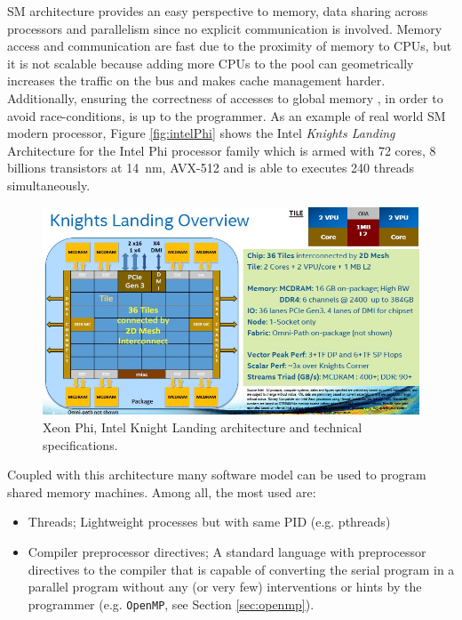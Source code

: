 \begin{description}
\begin{description}
\begin{itemize}
	\end{itemize}
	SM architecture provides an easy perspective to memory,	data sharing across processors and parallelism since no explicit communication is involved. Memory access and communication are fast due to the proximity of memory to CPUs, but it is not scalable because adding more CPUs to the pool can geometrically increases the traffic on the bus and makes cache management harder. Additionally, ensuring the correctness of accesses to global memory , in order to avoid race-conditions, is up to the programmer.
	As an example of real world SM modern processor, Figure \ref{fig:intelPhi} shows the Intel \textit{Knights Landing} Architecture for the Intel Phi processor family which is armed with 72 cores, $8$ billions transistors at \SI{14}{\nano\metre}, AVX-512 and is able to executes 240 threads simultaneously.
		\begin{figure}
		\centering
		\label{fig:distribuiteMemory}
		\includegraphics[width=1.0\textwidth]{./images/parallel_programming/xeonphi}
		\caption{Xeon Phi, Intel Knight Landing architecture and technical specifications.}
	\end{figure}

	Coupled with this architecture many software model can be used to program
	shared memory machines. Among all, the most used are:
	\begin{itemize}
		\item Threads; Lightweight processes but with same PID (e.g. pthreads)
		\item Compiler preprocessor directives; A standard language with preprocessor directives to the compiler that is capable of converting the serial program in a parallel program without any (or very few) interventions or hints by the programmer (e.g. \texttt{OpenMP}, see Section \ref{sec:openmp}).		
	\end{itemize}	


\end{description}
\end{description}
